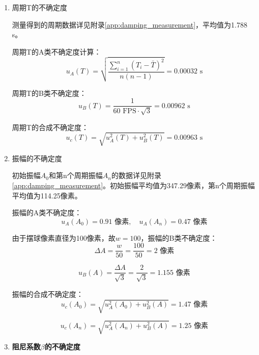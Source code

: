 \begin{enumerate}[leftmargin=*]
\item 周期T的不确定度

测量得到的周期数据详见附录\ref{app:damping_measurement}，平均值为1.788 s。

周期T的A类不确定度计算：
\begin{equation}
u_A(T) = \sqrt{\frac{\sum_{i=1}^{n}(T_i-\bar{T})^2}{n(n-1)}} = 0.00032\text{ s}
\end{equation}

周期T的B类不确定度：
\begin{equation}
u_B(T) = \frac{1}{60\text{ FPS}\cdot\sqrt{3}} = 0.00962\text{ s}
\end{equation}

周期T的合成不确定度：
\begin{equation}
u_c(T) = \sqrt{u_A^2(T) + u_B^2(T)} = 0.00963\text{ s}
\end{equation}

\item 振幅的不确定度

初始振幅$A_0$和第n个周期振幅$A_n$的数据详见附录\ref{app:damping_measurement}。初始振幅平均值为347.29像素，第n个周期振幅平均值为114.25像素。

振幅的A类不确定度：
\begin{equation}
u_A(A_0) = 0.91\text{ 像素}, \quad u_A(A_n) = 0.47\text{ 像素}
\end{equation}

由于摆球像素直径为100像素，故$w=100$，振幅的B类不确定度：
\begin{equation}
\Delta A = \frac{w}{50} = \frac{100}{50} = 2\text{ 像素}
\end{equation}

\begin{equation}
u_B(A) = \frac{\Delta A}{\sqrt{3}} = \frac{2}{\sqrt{3}} = 1.155\text{ 像素}
\end{equation}

振幅的合成不确定度：
\begin{equation}
u_c(A_0) = \sqrt{u_A^2(A_0) + u_B^2(A)} = 1.47\text{ 像素}
\end{equation}

\begin{equation}
u_c(A_n) = \sqrt{u_A^2(A_n) + u_B^2(A)} = 1.25\text{ 像素}
\end{equation}

\item \textbf{阻尼系数$\beta$的不确定度}


\end{enumerate}
